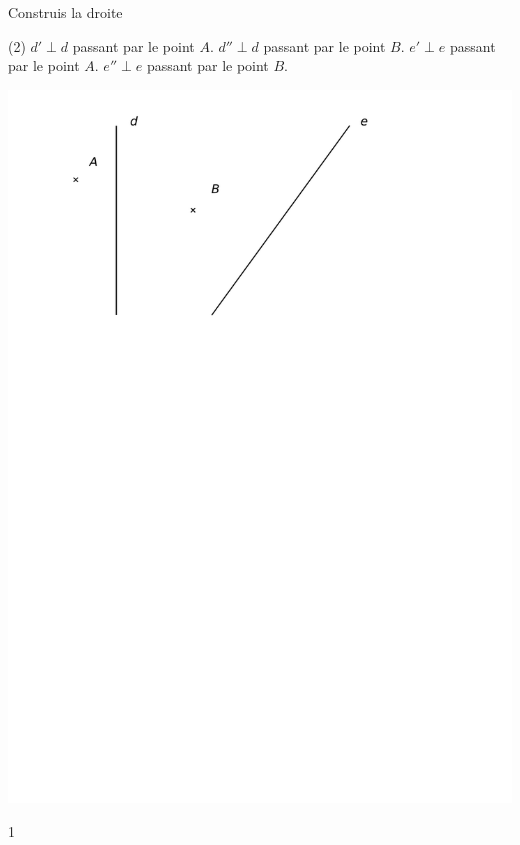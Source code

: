 \documentclass[a4paper,11pt]{report}
\begin{document}
\begin{exop}{Construis la droite 
		\begin{tasks}[after-item-skip = 0.4em](2)
	\task $d' \perp d$ passant par le point $A$.
	\task $d''\perp d$ passant par le point $B$.
	\task $e'\perp e$ passant par le point $A$.
	\task $e''\perp e$ passant par le point $B$.
\end{tasks}
	
\begin{center}
	\includegraphics[scale=0.8]{media/es-11/13-8}
\end{center}}
{1}
\end{exop}
\end{document}
